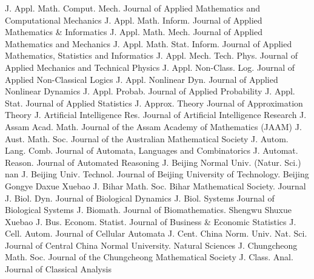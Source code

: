{J. Appl. Math. Comput. Mech.}
{Journal of Applied Mathematics and Computational Mechanics}
{J. Appl. Math. Inform.}
{Journal of Applied Mathematics & Informatics}
{J. Appl. Math. Mech.}
{Journal of Applied Mathematics and Mechanics}
{J. Appl. Math. Stat. Inform.}
{Journal of Applied Mathematics, Statistics and Informatics}
{J. Appl. Mech. Tech. Phys.}
{Journal of Applied Mechanics and Technical Physics}
{J. Appl. Non-Class. Log.}
{Journal of Applied Non-Classical Logics}
{J. Appl. Nonlinear Dyn.}
{Journal of Applied Nonlinear Dynamics}
{J. Appl. Probab.}
{Journal of Applied Probability}
{J. Appl. Stat.}
{Journal of Applied Statistics}
{J. Approx. Theory}
{Journal of Approximation Theory}
{J. Artificial Intelligence Res.}
{Journal of Artificial Intelligence Research}
{J. Assam Acad. Math.}
{Journal of the Assam Academy of Mathematics (JAAM)}
{J. Aust. Math. Soc.}
{Journal of the Australian Mathematical Society}
{J. Autom. Lang. Comb.}
{Journal of Automata, Languages and Combinatorics}
{J. Automat. Reason.}
{Journal of Automated Reasoning}
{J. Beijing Normal Univ. (Natur. Sci.)}
{nan}
{J. Beijing Univ. Technol.}
{Journal of Beijing University of Technology. Beijing Gongye Daxue Xuebao}
{J. Bihar Math. Soc.}
{Bihar Mathematical Society. Journal}
{J. Biol. Dyn.}
{Journal of Biological Dynamics}
{J. Biol. Systems}
{Journal of Biological Systems}
{J. Biomath.}
{Journal of Biomathematics. Shengwu Shuxue Xuebao}
{J. Bus. Econom. Statist.}
{Journal of Business & Economic Statistics}
{J. Cell. Autom.}
{Journal of Cellular Automata}
{J. Cent. China Norm. Univ. Nat. Sci.}
{Journal of Central China Normal University. Natural Sciences}
{J. Chungcheong Math. Soc.}
{Journal of the Chungcheong Mathematical Society}
{J. Class. Anal.}
{Journal of Classical Analysis}
